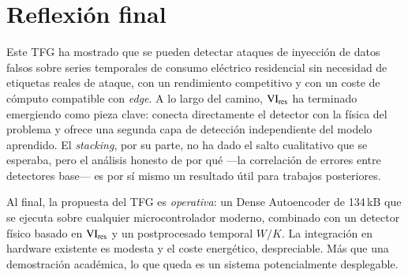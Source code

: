 \section{Reflexión final}

Este TFG ha mostrado que se pueden detectar ataques de inyección de datos falsos sobre series temporales de consumo eléctrico residencial sin necesidad de etiquetas reales de ataque, con un rendimiento competitivo y con un coste de cómputo compatible con \textit{edge}. A lo largo del camino, $\mathrm{VI}_{\text{res}}$ ha terminado emergiendo como pieza clave: conecta directamente el detector con la física del problema y ofrece una segunda capa de detección independiente del modelo aprendido. El \textit{stacking}, por su parte, no ha dado el salto cualitativo que se esperaba, pero el análisis honesto de por qué ---la correlación de errores entre detectores base--- es por sí mismo un resultado útil para trabajos posteriores.

Al final, la propuesta del TFG es \emph{operativa}: un Dense Autoencoder de 134\,kB que se ejecuta sobre cualquier microcontrolador moderno, combinado con un detector físico basado en $\mathrm{VI}_{\text{res}}$ y un postprocesado temporal $W/K$. La integración en hardware existente es modesta y el coste energético, despreciable. Más que una demostración académica, lo que queda es un sistema potencialmente desplegable.
